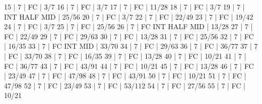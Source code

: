 15    |  7     |    FC                                        | 3/7   
16    |  7     |    FC                                        | 3/7   
17    |  7     |    FC                                        | 11/28   
18    |  7     |    FC                                        | 3/7   
19    |  7     |        INT  HALF            MID              | 25/56   
20    |  7     |    FC                                        | 3/7   
22    |  7     |    FC                                        | 22/49   
23    |  7     |    FC                                        | 19/42   
24    |  7     |    FC                                        | 3/7   
25    |  7     |    FC                                        | 25/56   
26    |  7     |    FC  INT  HALF            MID              | 13/28   
27    |  7     |    FC                                        | 22/49   
29    |  7     |    FC                                        | 29/63   
30    |  7     |    FC                                        | 13/28   
31    |  7     |    FC                                        | 25/56   
32    |  7     |    FC                                        | 16/35   
33    |  7     |    FC  INT                  MID              | 33/70   
34    |  7     |    FC                                        | 29/63   
36    |  7     |    FC                                        | 36/77   
37    |  7     |    FC                                        | 33/70   
38    |  7     |    FC                                        | 16/35   
39    |  7     |    FC                                        | 13/28   
40    |  7     |    FC                                        | 10/21   
41    |  7     |    FC                                        | 36/77   
43    |  7     |    FC                                        | 43/91   
44    |  7     |    FC                                        | 10/21   
45    |  7     |    FC                                        | 13/28   
46    |  7     |    FC                                        | 23/49   
47    |  7     |    FC                                        | 47/98   
48    |  7     |    FC                                        | 43/91   
50    |  7     |    FC                                        | 10/21   
51    |  7     |    FC                                        | 47/98   
52    |  7     |    FC                                        | 23/49   
53    |  7     |    FC                                        | 53/112   
54    |  7     |    FC                                        | 27/56   
55    |  7     |    FC                                        | 10/21   
